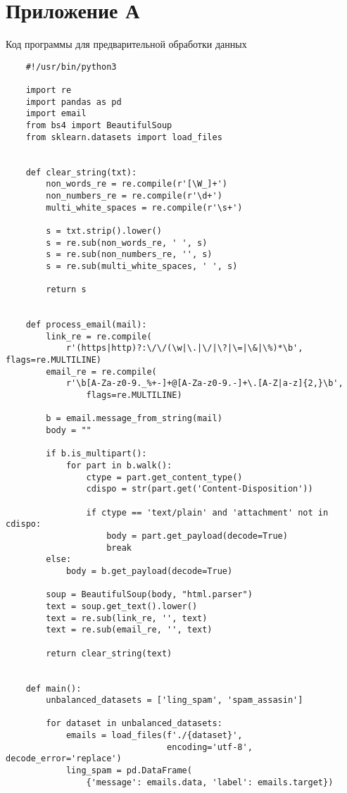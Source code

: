 \chapter*{Приложение А}\label{App1}
\begin{center}Код программы для предварительной обработки данных\end{center}
\begin{lstlisting}
    #!/usr/bin/python3

    import re
    import pandas as pd
    import email
    from bs4 import BeautifulSoup
    from sklearn.datasets import load_files

    
    def clear_string(txt):
        non_words_re = re.compile(r'[\W_]+')
        non_numbers_re = re.compile(r'\d+')
        multi_white_spaces = re.compile(r'\s+')

        s = txt.strip().lower()
        s = re.sub(non_words_re, ' ', s)
        s = re.sub(non_numbers_re, '', s)
        s = re.sub(multi_white_spaces, ' ', s)

        return s


    def process_email(mail):
        link_re = re.compile(
            r'(https|http)?:\/\/(\w|\.|\/|\?|\=|\&|\%)*\b', flags=re.MULTILINE)
        email_re = re.compile(
            r'\b[A-Za-z0-9._%+-]+@[A-Za-z0-9.-]+\.[A-Z|a-z]{2,}\b', 
                flags=re.MULTILINE)

        b = email.message_from_string(mail)
        body = ""

        if b.is_multipart():
            for part in b.walk():
                ctype = part.get_content_type()
                cdispo = str(part.get('Content-Disposition'))

                if ctype == 'text/plain' and 'attachment' not in cdispo:
                    body = part.get_payload(decode=True)
                    break
        else:
            body = b.get_payload(decode=True)

        soup = BeautifulSoup(body, "html.parser")
        text = soup.get_text().lower()
        text = re.sub(link_re, '', text)
        text = re.sub(email_re, '', text)

        return clear_string(text)


    def main():
        unbalanced_datasets = ['ling_spam', 'spam_assasin']

        for dataset in unbalanced_datasets:
            emails = load_files(f'./{dataset}',
                                encoding='utf-8', decode_error='replace')
            ling_spam = pd.DataFrame(
                {'message': emails.data, 'label': emails.target})


\end{lstlisting}

